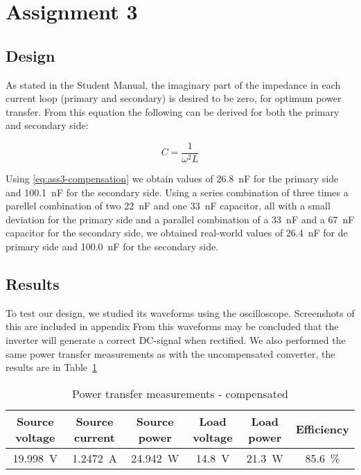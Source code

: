 \documentclass[11pt,titlepage]{report}
\begin{document}
\chapter*{Assignment 3}
\section*{Design}
As stated in the Student Manual, the imaginary part of the impedance in each current loop (primary and secondary) is desired to be zero, for optimum power transfer. From this equation the following can be derived for both the primary and secondary side:

\begin{equation}
\label{eq:ass3-compensation}
C = \frac{1}{\omega^2L}
\end{equation}

Using \ref{eq:ass3-compensation} we obtain values of \SI{26.8}{nF} for the primary side and \SI{100.1}{nF} for the secondary side. Using a series combination of three times a parellel combination of two \SI{22}{nF} and one \SI{33}{nF} capacitor, all with a small deviation for the primary side and a parallel combination of a \SI{33}{nF} and a \SI{67}{nF} capacitor for the secondary side, we obtained real-world values of \SI{26.4}{nF} for de primary side and \SI{100.0}{nF} for the secondary side.


\section*{Results}
To test our design, we studied its waveforms using the oscilloscope. Screenshots of this are included in appendix 
From this waveforms may be concluded that the inverter will generate a correct DC-signal when rectified.
We also performed the same power transfer measurements as with the uncompensated converter, the results are in Table~\ref{tab:ass3-power}

\begin{table}[H]
	\centering
	\caption{Power transfer measurements - compensated}
	\label{tab:ass3-power}
	\begin{tabular}{c c c c c c}
		\hline\hline
		Source voltage & Source current & Source power & Load voltage & Load power & Efficiency \\
		\hline
		\SI{19.998}{V} & \SI{1.2472}{A} & \SI{24.942}{W} & \SI{14.8}{V} & \SI{21.3}{W} & \SI{85.6}{\percent} \\
		\hline
		\end{tabular}
\end{table}
\end{document}
